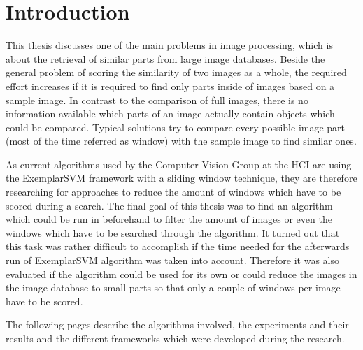 \chapter{Introduction}


This thesis discusses one of the main problems in image processing, which is about the retrieval of similar parts from large image databases.
Beside the general problem of scoring the similarity of two images as a whole, the required effort increases if it is required to find only parts inside of images based on a sample image. In contrast to the comparison of full images, there is no information available which parts of an image actually contain objects which could be compared.
Typical solutions try to compare every possible image part (most of the time referred as window) with the sample image to find similar ones.
\bigskip

As current algorithms used by the Computer Vision Group at the \ac{HCI} are using the ExemplarSVM \cite{Malisiewicz2011} framework with a sliding window technique, they are therefore researching for approaches to reduce the amount of windows which have to be scored during a search. 
The final goal of this thesis was to find an algorithm which could be run in beforehand to filter the amount of images or even the windows which have to be searched through the algorithm. It turned out that this task was rather difficult to accomplish if the time needed for the afterwards run of ExemplarSVM algorithm was taken into account. Therefore it was also evaluated if the algorithm could be used for its own or could reduce the images in the image database to small parts so that only a couple of windows per image have to be scored.

The following pages describe the algorithms involved, the experiments and their results and the different frameworks which were developed during the research.